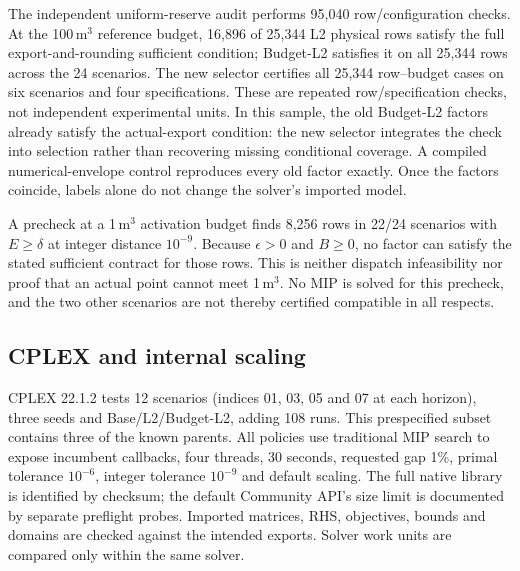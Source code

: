 The independent uniform-reserve audit performs 95,040 row/configuration checks.
At the 100\,m$^3$ reference budget, 16,896 of 25,344 L2 physical rows satisfy the
full export-and-rounding sufficient condition; Budget-L2 satisfies it on all
25,344 rows across the 24 scenarios. The new selector certifies all 25,344
row--budget cases on six scenarios and four specifications. These are repeated
row/specification checks, not independent experimental units. In this sample,
the old Budget-L2 factors already satisfy the actual-export condition: the new
selector integrates the check into selection rather than recovering missing
conditional coverage. A compiled numerical-envelope control reproduces every
old factor exactly. Once the factors coincide, labels alone do not change the
solver's imported model.

A precheck at a 1\,m$^3$ activation budget finds 8,256 rows in 22/24 scenarios
with $E\ge\delta$ at integer distance $10^{-9}$. Because $\epsilon>0$ and
$B\ge0$, no factor can satisfy the stated sufficient contract for those rows.
This is neither dispatch infeasibility nor proof that an actual point cannot
meet 1\,m$^3$. No MIP is solved for this precheck, and the two other scenarios
are not thereby certified compatible in all respects.

\subsection{CPLEX and internal scaling}
CPLEX 22.1.2 tests 12 scenarios (indices 01, 03, 05 and 07 at each horizon),
three seeds and Base/L2/Budget-L2, adding 108 runs. This prespecified subset
contains three of the known parents. All policies use traditional MIP search
to expose incumbent callbacks, four threads, 30 seconds, requested gap 1\%,
primal tolerance $10^{-6}$, integer tolerance $10^{-9}$ and default scaling.
The full native library is identified by checksum; the default Community API's
size limit is documented by separate preflight probes. Imported matrices, RHS,
objectives, bounds and domains are checked against the intended exports.
Solver work units are compared only within the same solver.

